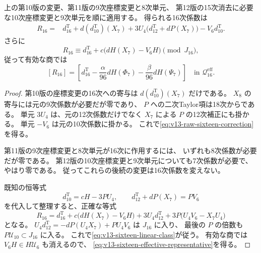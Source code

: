 \begin{proposition}[16次の正規化補正式]
\label{prop:v13-actual-sixteen-correction}
上の第10版の変更、第11版の9次座標変更と8次単元、
第12版の15次消去に必要な10次座標変更と9次単元を順に適用する。
得られる16次係数は
\begin{equation}\label{eq:v13-raw-sixteen-correction}
 \boxed{\begin{aligned}
 R_{16}={}&d^{\mathrm T}_{16}+d(d^{\mathrm T}_{10})(X_7)
        +3U_4\bigl(d^{\mathrm T}_{12}+dP(X_7)\bigr)
        -V_6d^{\mathrm T}_{10}.
 \end{aligned}}
\end{equation}
さらに
\begin{equation}\label{eq:v13-sixteen-linear-class}
 R_{16}\equiv d^{\mathrm T}_{16}
                  +c\bigl(dH(X_7)-V_6H\bigr)\pmod{J_{16}},
\end{equation}
従って有効な商では
\begin{equation}\label{eq:v13-sixteen-effective-representative}
 \boxed{\displaystyle
 [R_{16}]
 =\left[d^{\mathrm T}_{16}
       -\frac{\alpha}{96}dH(\Phi_7)
       -\frac{\beta}{96}dH(\Psi_7)\right]
 \quad\text{in }\mathcal Q^{\mathrm{eff}}_{16}.
 }
\end{equation}
\end{proposition}
\begin{proof}
第10版の座標変更の16次への寄与は
$d(d^{\mathrm T}_{10})(X_7)$ だけである。
$X_8$ の寄与には元の9次係数が必要だが零であり、
$P$ への二次Taylor項は18次からである。
単元 $3U_4$ は、元の12次係数だけでなく
$X_7$ による $P$ の12次補正にも掛かる。
単元 $-V_6$ は元の10次係数に掛かる。
これで\eqref{eq:v13-raw-sixteen-correction}を得る。

第11版の9次座標変更と8次単元が16次に作用するには、
いずれも8次係数が必要だが零である。
第12版の10次座標変更と9次単元についても7次係数が必要で、やはり零である。
従ってこれらの後続の変更は16次係数を変えない。

既知の恒等式
\[
 d^{\mathrm T}_{10}=cH-3PU_4,\qquad
 d^{\mathrm T}_{12}+dP(X_7)=PV_6
\]
を代入して整理すると、正確な等式
\[
 R_{16}=d^{\mathrm T}_{16}
       +c\bigl(dH(X_7)-V_6H\bigr)
       +3U_4d^{\mathrm T}_{12}
       +3P\bigl(U_4V_6-X_7U_4\bigr)
\]
となる。
$U_4d^{\mathrm T}_{12}=-dP(U_4X_7)+PU_4V_6$ は $J_{16}$ に入り、
最後の $P$ の倍数も $P\mathcal U_{10}\subset J_{16}$ に入る。
これで\eqref{eq:v13-sixteen-linear-class}が従う。
有効な商では $V_6H\in H\mathcal U_6$ も消えるので、
\eqref{eq:v13-sixteen-effective-representative}を得る。
\end{proof}

